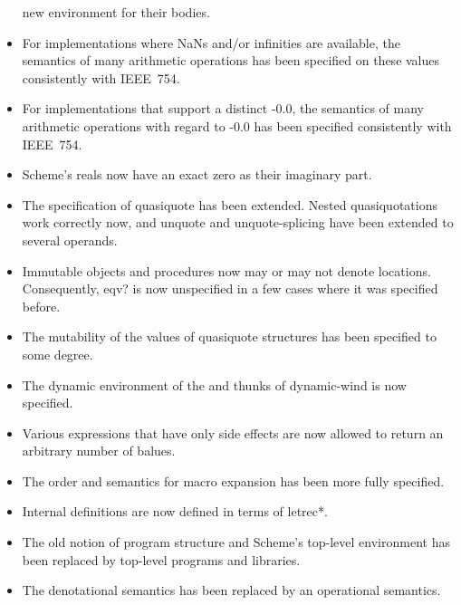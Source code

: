 \begin{itemize}
  new environment for their bodies.
\item For implementations where NaNs and/or infinities are available,
  the semantics of many arithmetic operations has been specified on
  these values consistently with IEEE~754.
\item For implementations that support a distinct -0.0, the semantics
  of many arithmetic operations with regard to -0.0 has been specified
  consistently with IEEE~754.
\item Scheme's reals now have an exact zero as their imaginary part.
\item The specification of {\cf quasiquote} has been extended.  Nested
  quasiquotations work correctly now, and {\cf unquote} and {\cf
    unquote-splicing} have been extended to several operands.
\item Immutable objects and procedures now may or may not denote
  locations.  Consequently, {\cf eqv?} is now unspecified in a few
  cases where it was specified before.
\item The mutability of the values of {\cf quasiquote} structures has
  been specified to some degree.
\item The dynamic environment of the  and 
  thunks of {\cf dynamic-wind} is now specified.
\item Various expressions that have only side effects are now allowed
  to return an arbitrary number of balues.
\item The order and semantics for macro expansion has been more fully
  specified.
\item Internal definitions are now defined in terms of {\cf letrec*}.
\item The old notion of program structure and Scheme's top-level
  environment has been replaced by top-level programs and libraries.
\item The denotational semantics has been replaced by an operational
  semantics.
\end{itemize}

